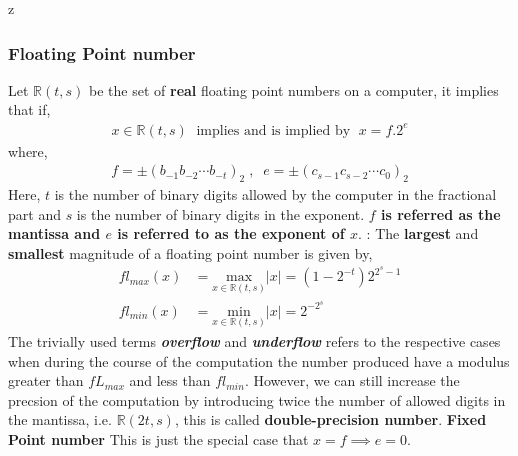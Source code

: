 z\documentclass[a4paper,12pt,twoside]{book}
\begin{document}
\subsubsection{Floating Point number}
Let $\mathbb{R}\left( t,s \right) $ be the set of \textbf{real} floating point numbers on a computer, it implies that if,
\begin{equation*}
	\begin{split}
		x\in  \mathbb{R}\left( t,s \right) \; \text{ implies and is implied by } \; \boxed{x = f.2^{e}}
	\end{split}
\end{equation*}
where, 
\begin{equation*}
	\begin{split}
		f = \pm\left( b_{-1}b_{-2}\cdots b_{-t} \right)_2 \;,\;\; e=\pm \left( c_{s-1} c_{s-2} \cdots c_0 \right)_2
	\end{split}
\end{equation*}
Here, $t$ is the number of binary digits allowed by the computer in the fractional part and  $s$ is the number of binary digits in the exponent.  \textbf{$f$ is referred as the mantissa and  $e$ is referred to as the exponent of  $x$}.
\newline\newline
{} : The \textbf{largest} and \textbf{smallest} magnitude of a floating point number is given by,
\begin{equation}
	\label{min-max-magn}
	\begin{split}
		fl_{max}\left( x \right) &=  \underset{x \in \mathbb{R}\left( t,s \right) } {\text{max}} \vert x\vert = \left( 1-2^{-t} \right) 2^{2^{s}-1}\\
		fl_{min}\left( x \right) &=  \underset{x \in  \mathbb{R}\left( t,s \right) }{\text{min}} \vert x \vert = 2^{-2^{s}}
	\end{split}
\end{equation}
The trivially used terms \textbf{\textit{overflow}} and \textbf{\textit{underflow}} refers to the respective cases when during the course of the computation the number produced have a modulus greater than $fL_{max}$ and less than $fl_{min}$.
\newline
However, we can still increase the precsion of the computation by introducing twice the number of allowed digits in the mantissa, i.e. $\mathbb{R}\left( 2t,s \right) $, this is called \textbf{double-precision number}.
\newline\newline
\textbf{Fixed Point number}
\newline\newline
This is just the special case that $\boxed{x=f \implies e=0}$.
\end{document}
